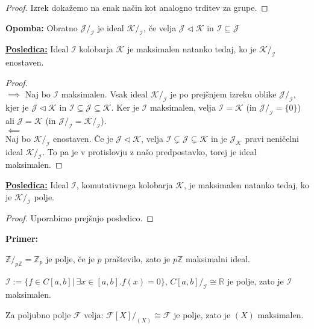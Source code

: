 \documentclass[a4paper]{article}
\newcounter{environment:definition_counter}
\newcounter{environment:theorem_counter}
\newcounter{environment:statement_counter}
\newcounter{example:example_counter}
\newenvironment{example}
{\textbf{Primer:}\\}
{\setcounter{example:example_counter}{0}}
\newenvironment{example_case}
{\refstepcounter{example:example_counter} \arabic{example:example_counter}.}
{\\}
\newenvironment{remark}
{\textbf{Opomba:}}
{}
\newenvironment{corollary}
{\underline{\textbf{Posledica:}}}
{}
\begin{document}
\begin{proof}
Izrek dokažemo na enak način kot analogno trditev za grupe.
\end{proof}

\begin{remark}
Obratno $\mathcal{J}/_{\mathcal{I}}$ je ideal $\mathcal{K}/_{\mathcal{I}}$, če velja $\mathcal{J} \triangleleft \mathcal{K}$ in $\mathcal{I} \subseteq \mathcal{J}$
\end{remark}

\begin{corollary}
Ideal $\mathcal{I}$ kolobarja $\mathcal{K}$ je maksimalen natanko tedaj, ko je $\mathcal{K}/_{\mathcal{I}}$ enostaven.
\end{corollary}

\begin{proof}\leavevmode\\
$\implies$
Naj bo $\mathcal{I}$ maksimalen. Vsak ideal $\mathcal{K}/_{\mathcal{I}}$ je po prejšnjem izreku oblike $\mathcal{J}/_{\mathcal{I}}$, kjer je $\mathcal{J} \triangleleft \mathcal{K}$ in $\mathcal{I} \subseteq \mathcal{J} \subseteq \mathcal{K}$. Ker je $\mathcal{I}$ maksimalen, velja $\mathcal{I} =\mathcal{K}$ (in $\mathcal{J}/_{\mathcal{I}} = \{ 0 \}$) ali $\mathcal{J} = \mathcal{K}$ (in $\mathcal{J}/_{\mathcal{I}} = \mathcal{K}/_{\mathcal{I}}$). \\
$\impliedby$\\
Naj bo  $\mathcal{K}/_{\mathcal{I}}$ enostaven. Če je $\mathcal{J} \triangleleft \mathcal{K}$, velja $\mathcal{I} \subsetneq \mathcal{J} \subsetneq \mathcal{K}$ in je $\mathcal{J}_{\mathcal{K}}$ pravi neničelni ideal $\mathcal{K}/_{\mathcal{I}}$. To pa je v protislovju z našo predpostavko, torej je ideal maksimalen.
\end{proof}

\begin{corollary}
Ideal $\mathcal{I}$, komutativnega kolobarja $\mathcal{K}$, je maksimalen natanko tedaj, ko je $\mathcal{K}/_\mathcal{I}$ polje.
\end{corollary}

\begin{proof}
Uporabimo prejšnjo posledico.
\end{proof}

\begin{example}
\begin{example_case}
$\mathbb{Z}/_{p\mathbb{Z}} = \mathbb{Z}_p$ je polje, če je $p$ praštevilo, zato je $p\mathbb{Z}$ maksimalni ideal.
\end{example_case}
\begin{example_case}
$\mathcal{I} := \{ f \in C[a,b] | \ \exists x \in [a,b]. f(x) = 0 \}$, $C[a,b]/_{\mathcal{I}} \cong \mathbb{R}$ je polje, zato je $\mathcal{I}$ maksimalen. 
\end{example_case}
\begin{example_case}
Za poljubno polje $\mathcal{F}$ velja: $\mathcal{F}[X]/_{(X)} \cong \mathcal{F}$ je polje, zato je $(X)$ maksimalen.
\end{example_case}
\end{example}
\end{document}
